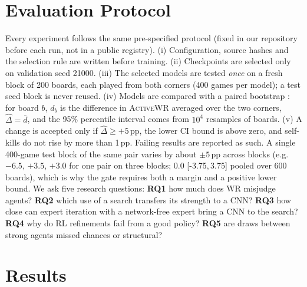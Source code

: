 \documentclass[11pt]{article}
\newcommand{\awr}{\textsc{ActiveWR}}
\newcommand{\pp}{\,pp}
\newcommand{\ci}[2]{[#1,\,#2]}
\begin{document}
\section{Evaluation Protocol}
\label{sec:protocol}

Every experiment follows the same pre-specified protocol (fixed in our repository before each run, not in a public registry). (i) Configuration, source hashes and the selection rule are written before training. (ii) Checkpoints are selected only on validation seed 21000. (iii) The selected models are tested \emph{once} on a fresh block of 200 boards, each played from both corners (400 games per model); a test seed block is never reused. (iv) Models are compared with a paired bootstrap \cite{efron1979bootstrap}: for board $b$, $d_b$ is the difference in \awr{} averaged over the two corners, $\hat\Delta=\bar d$, and the 95\% percentile interval comes from $10^4$ resamples of boards. (v) A change is accepted only if $\hat\Delta\ge+5$\pp{}, the lower CI bound is above zero, and self-kills do not rise by more than 1\pp{}. Failing results are reported as such. A single 400-game test block of the same pair varies by about $\pm5$\pp{} across blocks (e.g.\ $-6.5$, $+3.5$, $+3.0$ for one pair on three blocks; $0.0$ \ci{-3.75}{3.75} pooled over 600 boards), which is why the gate requires both a margin and a positive lower bound. We ask five research questions:
\textbf{RQ1} how much does WR misjudge agents? \textbf{RQ2} which use of a search transfers its strength to a CNN? \textbf{RQ3} how close can expert iteration with a network-free expert bring a CNN to the search? \textbf{RQ4} why do RL refinements fail from a good policy? \textbf{RQ5} are draws between strong agents missed chances or structural?

\section{Results}
\end{document}
